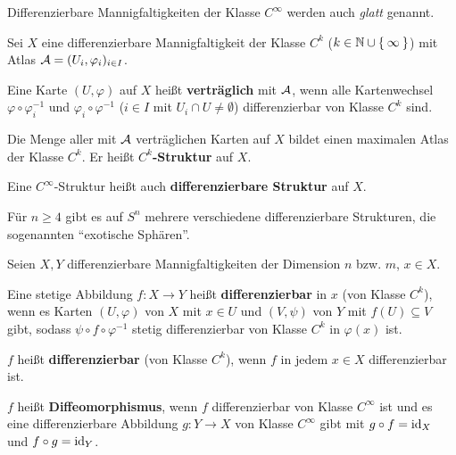 Differenzierbare Mannigfaltigkeiten der Klasse $C^\infty$ werden auch
\textit{glatt} genannt.

\begin{definition}%
    Sei $X$ eine differenzierbare Mannigfaltigkeit der Klasse $C^k$ 
    ($k \in \mathbb{N} \cup \Set{\infty}$) mit Atlas $\mathcal{A} = (U_i, \varphi_i)_{i \in I}$.

    \begin{defenum}
        \item Eine Karte $(U, \varphi)$ auf $X$ heißt \textbf{verträglich}
              mit $\mathcal{A}$, wenn alle Kartenwechsel $\varphi \circ \varphi_i^{-1}$
              und $\varphi_i \circ \varphi^{-1}$ ($i \in I$ mit $U_i \cap U \neq \emptyset$)
              differenzierbar von Klasse $C^k$ sind.
        \item Die Menge aller mit $\mathcal{A}$ verträglichen Karten auf 
              $X$ bildet einen maximalen Atlas der Klasse $C^k$. Er
              heißt \textbf{$C^k$-Struktur} auf $X$.
            
              Eine $C^\infty$-Struktur heißt auch \textbf{differenzierbare Struktur}
              auf $X$.
    \end{defenum}
\end{definition}

\begin{bemerkung}
    Für $n \geq 4$ gibt es auf $S^n$ mehrere verschiedene differenzierbare
    Strukturen, die sogenannten \enquote{exotische Sphären}.
\end{bemerkung}

\begin{definition}
    Seien $X, Y$ differenzierbare Mannigfaltigkeiten der Dimension
    $n$ bzw. $m$, $x \in X$.

    \begin{defenum}
        \item Eine stetige Abbildung $f:X \rightarrow Y$ heißt\label{def:stetigeAbbildungDiffbar}
              \textbf{differenzierbar}
              in $x$ (von Klasse $C^k$),
              wenn es Karten $(U, \varphi)$ von $X$ mit
              $x \in U$ und $(V, \psi)$ von $Y$ mit $f(U) \subseteq V$
              gibt, sodass $\psi \circ f \circ \varphi^{-1}$ stetig
              differenzierbar von Klasse $C^k$ in $\varphi(x)$ ist.
        \item $f$ heißt \textbf{differenzierbar}
              (von Klasse $C^k$), wenn $f$ in jedem $x \in X$ 
              differenzierbar ist.
        \item $f$ heißt \textbf{Diffeomorphismus},
              wenn $f$ differenzierbar von Klasse $C^\infty$ ist und
              es eine differenzierbare Abbildung $g: Y \rightarrow X$
              von Klasse $C^\infty$ gibt mit $g \circ f = \textnormal{id}_X$
              und $f \circ g = \textnormal{id}_Y$.
    \end{defenum}
\end{definition}

